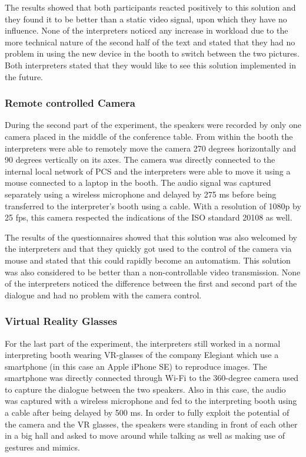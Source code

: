 \documentclass[output=paper]{langsci/langscibook}
\begin{document}
The results showed that both participants reacted positively to this solution and they found it to be better than a static video signal, upon which they have no influence. None of the interpreters noticed any increase in workload due to the more technical nature of the second half of the text and stated that they had no problem in using the new device in the booth to switch between the two pictures. Both interpreters stated that they would like to see this solution implemented in the future.

\subsubsection{Remote controlled Camera}

During the second part of the experiment, the speakers were recorded by only one camera placed in the middle of the conference table. From within the booth the interpreters were able to remotely move the camera 270 degrees horizontally and 90 degrees vertically on its axes. The camera was directly connected to the internal local network of PCS and the interpreters were able to move it using a mouse connected to a laptop in the booth. The audio signal was captured separately using a wireless microphone and delayed by 275 ms before being transferred to the interpreter’s booth using a cable. With a resolution of 1080p by 25 fps, this camera respected the indications of the ISO standard 20108 as well. 

The results of the questionnaires showed that this solution was also welcomed by the interpreters and that they quickly got used to the control of the camera via mouse and stated that this could rapidly become an automatism. This solution was also considered to be better than a non-controllable video transmission. None of the interpreters noticed the difference between the first and second part of the dialogue and had no problem with the camera control.

\subsubsection{Virtual Reality Glasses}

For the last part of the experiment, the interpreters still worked in a normal interpreting booth wearing VR-glasses of the company Elegiant which use a smartphone (in this case an Apple iPhone SE) to reproduce images. The smartphone was directly connected through Wi-Fi to the 360-degree camera used to capture the dialogue between the two speakers. Also in this case, the audio was captured with a wireless microphone and fed to the interpreting booth using a cable after being delayed by 500 ms. In order to fully exploit the potential of the camera and the VR glasses, the speakers were standing in front of each other in a big hall and asked to move around while talking as well as making use of gestures and mimics.
\end{document}

